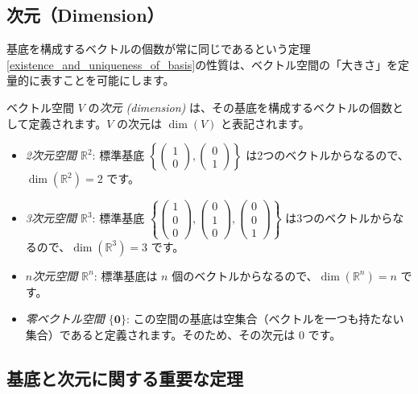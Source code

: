 \subsection{次元（Dimension）}

基底を構成するベクトルの個数が常に同じであるという定理\ref{existence_and_uniqueness_of_basis}の性質は、ベクトル空間の「大きさ」を定量的に表すことを可能にします。

\begin{dfn}[次元] \label{dimension}
ベクトル空間 $V$ の\emph{次元 (dimension)} は、その基底を構成するベクトルの個数として定義されます。$V$ の次元は $\dim(V)$ と表記されます。
\end{dfn}

\begin{ex}
\begin{itemize}
\item \emph{2次元空間 $\mathbb{R}^2$}: 標準基底 $\left\{\begin{pmatrix} 1 \\ 0 \end{pmatrix}, \begin{pmatrix} 0 \\ 1 \end{pmatrix}\right\}$ は2つのベクトルからなるので、$\dim(\mathbb{R}^2) = 2$ です。
\item \emph{3次元空間 $\mathbb{R}^3$}: 標準基底 $\left\{\begin{pmatrix} 1 \\ 0 \\ 0 \end{pmatrix}, \begin{pmatrix} 0 \\ 1 \\ 0 \end{pmatrix}, \begin{pmatrix} 0 \\ 0 \\ 1 \end{pmatrix}\right\}$ は3つのベクトルからなるので、$\dim(\mathbb{R}^3) = 3$ です。
\item \emph{$n$次元空間 $\mathbb{R}^n$}: 標準基底は $n$ 個のベクトルからなるので、$\dim(\mathbb{R}^n) = n$ です。
\item \emph{零ベクトル空間 $\{\bm{0}\}$}: この空間の基底は空集合（ベクトルを一つも持たない集合）であると定義されます。そのため、その次元は $0$ です。
\end{itemize}
\end{ex}

\subsection{基底と次元に関する重要な定理}

